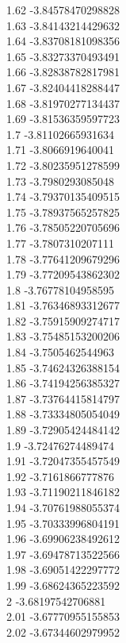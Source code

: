 {1.62	-3.84578470298828\\
1.63	-3.84143214429632\\
1.64	-3.83708181098356\\
1.65	-3.83273370493491\\
1.66	-3.82838782817981\\
1.67	-3.82404418288447\\
1.68	-3.81970277134437\\
1.69	-3.81536359597723\\
1.7	-3.81102665931634\\
1.71	-3.8066919640041\\
1.72	-3.80235951278599\\
1.73	-3.7980293085048\\
1.74	-3.79370135409515\\
1.75	-3.78937565257825\\
1.76	-3.78505220705696\\
1.77	-3.7807310207111\\
1.78	-3.77641209679296\\
1.79	-3.77209543862302\\
1.8	-3.76778104958595\\
1.81	-3.76346893312677\\
1.82	-3.75915909274717\\
1.83	-3.75485153200206\\
1.84	-3.7505462544963\\
1.85	-3.74624326388154\\
1.86	-3.74194256385327\\
1.87	-3.73764415814797\\
1.88	-3.73334805054049\\
1.89	-3.72905424484142\\
1.9	-3.72476274489474\\
1.91	-3.72047355457549\\
1.92	-3.7161866777876\\
1.93	-3.71190211846182\\
1.94	-3.70761988055374\\
1.95	-3.70333996804191\\
1.96	-3.69906238492612\\
1.97	-3.69478713522566\\
1.98	-3.69051422297772\\
1.99	-3.68624365223592\\
2	-3.68197542706881\\
2.01	-3.67770955155853\\
2.02	-3.67344602979952\\
}
